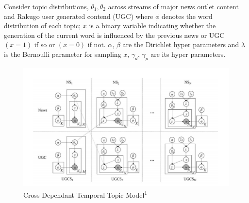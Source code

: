 \documentclass{article}
\begin{document}
Consider topic distributions, \begin{math} \theta_1, \theta_2 \end{math} across streams of major news outlet content and Rakugo user generated contend (UGC) where \begin{math} \phi \end{math} denotes the word distribution of each topic; \begin{math} x \end{math} is a binary variable indicating whether the generation of the current word is influenced by
the previous news or UGC \begin{math} (x = 1) \end{math} if so or \begin{math} (x = 0) \end{math} if not. \begin{math} \alpha \end{math}, \begin{math} \beta \end{math} are the Dirichlet hyper
parameters and \begin{math} \lambda \end{math} is the Bernoulli parameter for sampling \begin{math} x \end{math}, \begin{math} \gamma_d \end{math}, \begin{math} \gamma_p \end{math} are its hyper
parameters.

\begin{figure}[H]
\centering
\includegraphics[scale=0.4]{CDTTM.png}
\caption{Cross Dependant Temporal Topic Model\textsuperscript{1}}
\end{figure}
\end{document}
